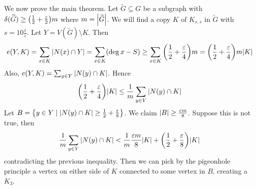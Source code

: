 We now prove the main theorem.
Let \( \widetilde G \subseteq G \) be a subgraph with \( \delta(\widetilde G) \geq \qty(\frac{1}{2} + \frac{\varepsilon}{2})m \) where \( m = \abs{\widetilde G} \).
We will find a copy \( K \) of \( K_{s,s} \) in \( \widetilde G \) with \( s = 10 \frac{t}{\varepsilon} \).
Let \( Y = V(\widetilde G) \setminus K \).
Then
\[ e(Y,K) = \sum_{x \in K} \abs{N(x) \cap Y} = \sum_{x \in K} (\deg x - S) \geq \sum_{x \in K} \qty(\frac{1}{2} + \frac{\varepsilon}{4})m = \qty(\frac{1}{2} + \frac{\varepsilon}{4})m\abs{K} \]
Also, \( e(Y,K) = \sum_{y \in Y} \abs{N(y) \cap K} \).
Hence
\[ \qty(\frac{1}{2} + \frac{\varepsilon}{4}) \abs{K} \leq \frac{1}{m} \sum_{y \in Y} \abs{N(y) \cap K} \]
Let \( B = \qty{y \in Y \mid \abs{N(y) \cap K} \geq \frac{1}{2} + \frac{\varepsilon}{8}} \).
We claim \( \abs{B} \geq \frac{\varepsilon m}{8} \).
Suppose this is not true, then
\[ \frac{1}{m}\sum_{y \in Y} \abs{N(y) \cap K} < \frac{1}{m} \frac{\varepsilon m}{8} \abs{K} + \qty(\frac{1}{2} + \frac{\varepsilon}{8})\abs{K} \]
contradicting the previous inequality.
Then we can pick by the pigeonhole principle a vertex on either side of \( K \) connected to some vertex in \( B \), creating a \( K_3 \).
\fi
